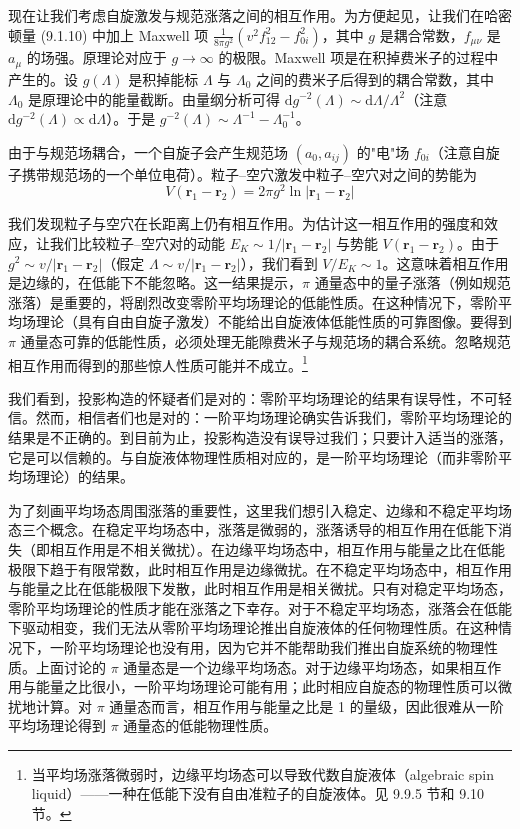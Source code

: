 现在让我们考虑自旋激发与规范涨落之间的相互作用。为方便起见，让我们在哈密顿量 (9.1.10) 中加上 Maxwell 项 $\frac{1}{8\pi g^{2}}(v^{2}f_{12}^{2}-f_{0i}^{2})$，其中 $g$ 是耦合常数，$f_{\mu\nu}$ 是 $a_{\mu}$ 的场强。原理论对应于 $g\to\infty$ 的极限。Maxwell 项是在积掉费米子的过程中产生的。设 $g(\Lambda)$ 是积掉能标 $\Lambda$ 与 $\Lambda_0$ 之间的费米子后得到的耦合常数，其中 $\Lambda_0$ 是原理论中的能量截断。由量纲分析可得 $\mathrm{d}g^{-2}(\Lambda)\sim\mathrm{d}\Lambda/\Lambda^{2}$（注意 $\mathrm{d}g^{-2}(\Lambda)\propto\mathrm{d}\Lambda$）。于是 $g^{-2}(\Lambda)\sim\Lambda^{-1}-\Lambda_0^{-1}$。

由于与规范场耦合，一个自旋子会产生规范场 $(a_0,a_{ij})$ 的"电"场 $f_{0i}$（注意自旋子携带规范场的一个单位电荷）。粒子–空穴激发中粒子–空穴对之间的势能为
\begin{equation*}
V(\pmb{r}_1-\pmb{r}_2)=2\pi g^{2}\ln|\pmb{r}_1-\pmb{r}_2|
\tag{9.1.20}
\end{equation*}

我们发现粒子与空穴在长距离上仍有相互作用。为估计这一相互作用的强度和效应，让我们比较粒子–空穴对的动能 $E_K\sim 1/|\pmb{r}_1-\pmb{r}_2|$ 与势能 $V(\pmb{r}_1-\pmb{r}_2)$。由于 $g^{2}\sim v/|\pmb{r}_1-\pmb{r}_2|$（假定 $\Lambda\sim v/|\pmb{r}_1-\pmb{r}_2|$），我们看到 $V/E_K\sim 1$。这意味着相互作用是边缘的，在低能下不能忽略。这一结果提示，$\pi$ 通量态中的量子涨落（例如规范涨落）是重要的，将剧烈改变零阶平均场理论的低能性质。在这种情况下，零阶平均场理论（具有自由自旋子激发）不能给出自旋液体低能性质的可靠图像。要得到 $\pi$ 通量态可靠的低能性质，必须处理无能隙费米子与规范场的耦合系统。忽略规范相互作用而得到的那些惊人性质可能并不成立。\footnote{当平均场涨落微弱时，边缘平均场态可以导致代数自旋液体（algebraic spin liquid）——一种在低能下没有自由准粒子的自旋液体。见 9.9.5 节和 9.10 节。}

我们看到，投影构造的怀疑者们是对的：零阶平均场理论的结果有误导性，不可轻信。然而，相信者们也是对的：一阶平均场理论确实告诉我们，零阶平均场理论的结果是不正确的。到目前为止，投影构造没有误导过我们；只要计入适当的涨落，它是可以信赖的。与自旋液体物理性质相对应的，是一阶平均场理论（而非零阶平均场理论）的结果。

为了刻画平均场态周围涨落的重要性，这里我们想引入稳定、边缘和不稳定平均场态三个概念。在稳定平均场态中，涨落是微弱的，涨落诱导的相互作用在低能下消失（即相互作用是不相关微扰）。在边缘平均场态中，相互作用与能量之比在低能极限下趋于有限常数，此时相互作用是边缘微扰。在不稳定平均场态中，相互作用与能量之比在低能极限下发散，此时相互作用是相关微扰。只有对稳定平均场态，零阶平均场理论的性质才能在涨落之下幸存。对于不稳定平均场态，涨落会在低能下驱动相变，我们无法从零阶平均场理论推出自旋液体的任何物理性质。在这种情况下，一阶平均场理论也没有用，因为它并不能帮助我们推出自旋系统的物理性质。上面讨论的 $\pi$ 通量态是一个边缘平均场态。对于边缘平均场态，如果相互作用与能量之比很小，一阶平均场理论可能有用；此时相应自旋态的物理性质可以微扰地计算。对 $\pi$ 通量态而言，相互作用与能量之比是 1 的量级，因此很难从一阶平均场理论得到 $\pi$ 通量态的低能物理性质。

